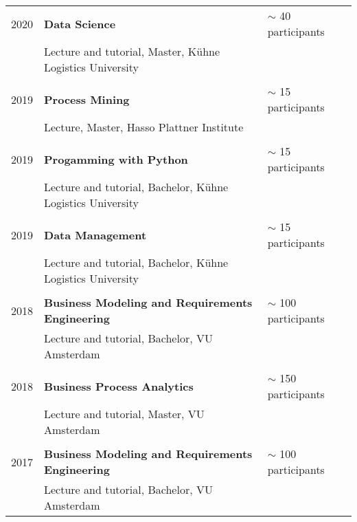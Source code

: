   
 
\begin{tabular}{P{3cm}P{8cm}P{3cm}}
\\
2020		& \textbf{Data Science}				& $\sim$ 40 participants \\
				& Lecture and tutorial, Master, Kühne Logistics University\\
				\\
2019		& \textbf{Process Mining} & $\sim$ 15 participants \\
				& Lecture, Master, Hasso Plattner Institute \\
				\\
2019		& \textbf{Progamming with Python}				& $\sim$ 15 participants \\
				& Lecture and tutorial, Bachelor, Kühne Logistics University\\
				\\
2019		& \textbf{Data Management}				& $\sim$ 15 participants \\
				& Lecture and tutorial, Bachelor, Kühne Logistics University\\
				\\
2018		& \textbf{Business Modeling and Requirements Engineering}	& $\sim $ 100 participants \\
				& Lecture and tutorial, Bachelor, VU Amsterdam \\
				\\				
2018 		& \textbf{Business Process Analytics} & $\sim$ 150 participants \\
				& Lecture and tutorial, Master, VU Amsterdam \\
				\\				
2017		& \textbf{Business Modeling and Requirements Engineering}	& $\sim $ 100 participants \\
				& Lecture and tutorial, Bachelor, VU Amsterdam \\
				\end{tabular}
